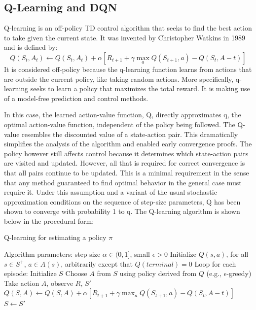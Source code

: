 \documentclass[12pt,a4paper]{article}
\begin{document}
\subsection{Q-Learning and DQN}\label{sec:q-learning}
Q-learning is an off-policy TD control algorithm that seeks to find the best action to take given the current state. It was invented by Christopher Watkins in 1989 and is defined by:
\begin{equation}
    \label{eq:q_learn}
    Q(S_t, A_t) \leftarrow Q(S_t, A_t) + \alpha [R_{t+1}+\gamma \max_aQ(S_{t+1},a)-Q(S_t,A-t)]
\end{equation}
It is considered off-policy because the q-learning function learns from actions that are outside the current policy, like taking random actions. More specifically, q-learning seeks to learn a policy that maximizes the total reward. It is making use of a model-free prediction and control methods.

In this case, the learned action-value function, Q, directly approximates q, the optimal
action-value function, independent of the policy being followed. The Q-value resembles the discounted value of a state-action pair. This dramatically
simplifies the analysis of the algorithm and enabled early convergence proofs. The policy however
still affects control because it determines which state-action pairs are visited and updated.
However, all that is required for correct convergence is that all pairs continue to be
updated. This is a minimal requirement in the sense that
any method guaranteed to find optimal behavior in the general case must require it.
Under this assumption and a variant of the usual stochastic approximation conditions on
the sequence of step-size parameters, Q has been shown to converge with probability 1 to
q. The Q-learning algorithm is shown below in the procedural form\cite{Sutton2015}:
\begin{algorithm}
    \caption{Q-learning for estimating a policy $\pi$}
    \begin{algorithmic}
    \State Algorithm parameters: step size $\alpha \in (0, 1]$, small  $\epsilon > 0$
    \State Initialize $Q(s,a)$, for all $s\in S^+$, $a\in A(s)$, arbitrarily except that $Q(terminal)=0$
    \State Loop for each episode:
        \State Initialize $S$
            \State Choose $A$ from $S$ using policy derived from $Q$ (e.g., $\epsilon$-greedy)
            \State Take action $A$, observe $R$, $S'$
            \State $Q(S, A) \leftarrow Q(S, A) + \alpha [R_{t+1}+\gamma \max_aQ(S_{t+1},a)-Q(S_t,A-t)]$
            \State $S \leftarrow S'$
        \EndFor
    \EndWhile
    \end{algorithmic}
\end{algorithm}
\end{document}
